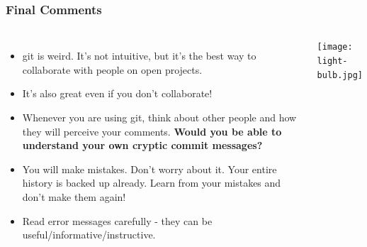\documentclass{beamer}
\begin{document}
\begin{frame}
\frametitle{Final Comments}
\begin{columns}
\begin{itemize}
\item git is weird. It's not intuitive, but it's the best way to collaborate with people on open projects.
\item It's also great even if you don't collaborate!
\item Whenever you are using git, think about other people and how they will perceive your comments. \textbf{Would you be able to understand your own cryptic commit messages?}
\item You will make mistakes. Don't worry about it. Your entire history is backed up already. Learn from your mistakes and don't make them again!
\item Read error messages carefully - they can be useful/informative/instructive.
\end{itemize}
\texttt{[image: light-bulb.jpg]}
\end{columns}
\end{frame}
\end{document}
